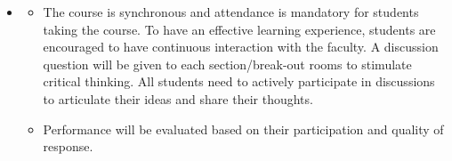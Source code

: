 \documentclass[letterpaper]{inzane_syllabus} %
\begin{document}
\begin{itemize}[label= \color{myCOLOR}{$\RHD$}]
        
    \item \textbf{\color{myCOLOR}{Class Participation \& Discussion }}          
    \begin{itemize}[label= \color{myCOLOR}{$\circ$}]
             \item The course is synchronous and attendance is mandatory for students taking the course. To have an effective learning experience, students are encouraged to have continuous interaction with the faculty. A discussion question will be given to each section/break-out rooms to stimulate critical thinking. All students need to actively participate in discussions to articulate their ideas and share their thoughts.
            \item Performance will be evaluated based on their participation and quality of response.
        \end{itemize}
\end{itemize}


\end{document}
